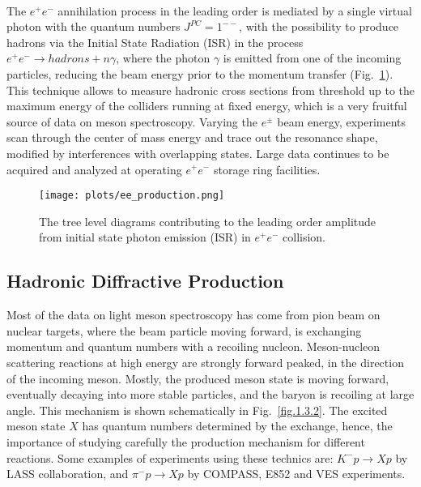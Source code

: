 ~\par The $e^{+}e^{-}$ annihilation process in the leading order is mediated by a single virtual photon with the quantum numbers $J^{PC} = 1^{--}$, with the possibility to produce hadrons via the Initial State Radiation (ISR) in the process $e^{+}e^{-} \rightarrow hadrons + n\gamma$, where the photon $\gamma$ is emitted from one of the incoming particles, reducing the beam energy prior to the momentum transfer (Fig.~\ref{fig.1.3.1}). This technique allows to measure hadronic cross sections from threshold up to the maximum energy of the colliders running at fixed energy, which is a very fruitful source of data on meson spectroscopy. Varying the $e^{\pm}$ beam energy, experiments scan through the center of mass energy and trace out the resonance shape, modified by interferences with overlapping states. Large data continues to be acquired and analyzed at operating $e^{+}e^{-}$ storage ring facilities.

\begin{figure}[H]
    \centering
        \texttt{[image: plots/ee\_production.png]}
        \caption{The tree level diagrams contributing to the leading order amplitude from initial state photon emission (ISR) in $e^{+}e^{-}$ collision.}
        \label{fig.1.3.1}
\end{figure}
 
 \subsection{Hadronic Diffractive Production}

 Most of the data on light meson spectroscopy has come from pion beam on nuclear targets, where the beam particle moving forward, is exchanging momentum and quantum numbers with a recoiling nucleon. Meson-nucleon scattering reactions at high energy are strongly forward peaked, in the direction of the incoming meson. Mostly, the produced meson state is moving forward, eventually decaying into more stable particles, and the baryon is recoiling at large angle. This mechanism is shown schematically in Fig.~\ref{fig.1.3.2}. The excited meson state $X$ has quantum numbers determined by the exchange, hence, the importance of studying carefully the production mechanism for different reactions. Some examples of experiments using these technics are: $K^{-}p \rightarrow Xp$ by LASS collaboration, and $\pi^{-}p \rightarrow Xp$ by COMPASS, E852 and VES experiments.

